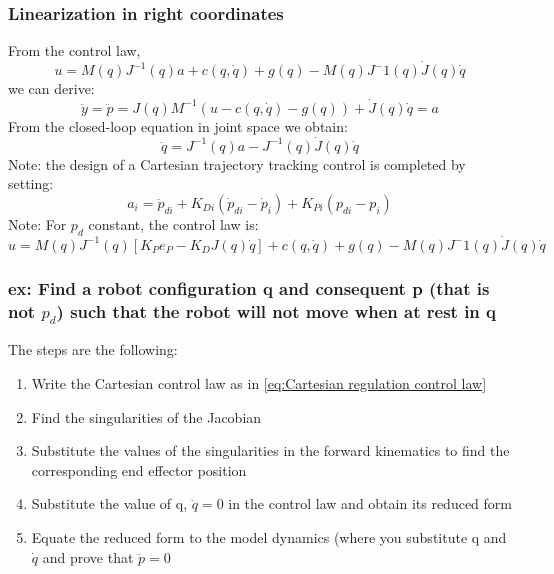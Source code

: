 \documentclass[a4paper,12pt]{article}
\begin{document}
\subsubsection{Linearization in right coordinates}
From the control law,
\begin{equation}
    u = M(q)J^{-1}(q)a + c(q,\dot{q}) + g(q) - M(q)J^-1(q)\dot{J}(q)\dot{q}
\end{equation}
we can derive:
\begin{equation}
    \ddot{y}=\ddot{p}= J(q)M^{-1}(u-c(q,\dot{q})-g(q))+\dot{J}(q)\dot{q}=a
\end{equation}
From the closed-loop equation in joint space we obtain:
\begin{equation}
    \ddot{q}=J^{-1}(q)a-J^{-1}(q)\dot{J}(q)\dot{q}
\end{equation}
Note: the design of a Cartesian trajectory tracking control is completed
by setting:
\begin{equation}
    a_i=\ddot{p}_{di}+K_{Di}(\dot{p}_{di}-\dot{p}_i)+K_{Pi}(p_{di}-p_i)
\end{equation}
Note: For $p_d$ constant, the control law is:
\begin{equation}
    u = M(q)J^{-1}(q)[K_Pe_P-K_DJ(q)\dot{q}]+c(q,\dot{q})+g(q) - M(q)J^-1(q)\dot{J}(q)\dot{q}
\end{equation}

\subsubsection{ex: Find a robot configuration q and consequent p (that is not 
$p_d$) such that the robot will not move when at rest in q}
The steps are the following:
\begin{enumerate}
    \item Write the Cartesian control law as in \ref{eq:Cartesian regulation control law}
    \item Find the singularities of the Jacobian
    \item Substitute the values of the singularities in the forward
    kinematics to find the corresponding end effector position
    \item Substitute the value of q, $\dot{q}=0$ in the control law 
    and obtain its reduced form
    \item Equate the reduced form to the model dynamics 
    (where you substitute q and $\dot{q}$ and prove that $\ddot{p}=0$
\end{enumerate}
\end{document}
